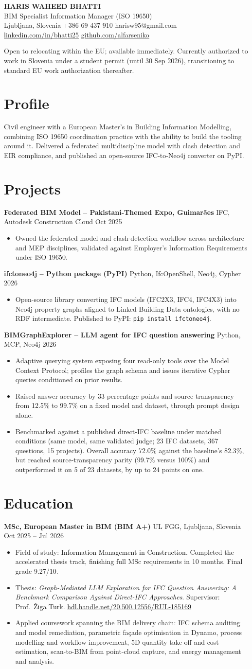 \documentclass[a4paper,10.5pt]{article}
\newcommand{\datefill}{\dotfill}
\newcommand{\entry}[3]{\vspace{2.5pt}\noindent\textbf{#1} \textbar{} #2 \datefill{} #3\par\vspace{0.5pt}}
\newcommand{\ROLELINE}{BIM Specialist \textbar{} Information Manager (ISO 19650)}
\newcommand{\projIfcToNeo}{%
\entry{ifctoneo4j -- Python package (PyPI)}{Python, IfcOpenShell, Neo4j, Cypher}{2026}
\begin{itemize}
  \item Open-source library converting IFC models (IFC2X3, IFC4, IFC4X3) into Neo4j
        property graphs aligned to Linked Building Data ontologies, with no RDF
        intermediate. Published to PyPI: \texttt{pip install ifctoneo4j}.
\end{itemize}}
\newcommand{\projBIMGraph}{%
\entry{BIMGraphExplorer -- LLM agent for IFC question answering}{Python, MCP, Neo4j}{2026}
\begin{itemize}
  \item Adaptive querying system exposing four read-only tools over the Model
        Context Protocol; profiles the graph schema and issues iterative Cypher
        queries conditioned on prior results.
  \item Raised answer accuracy by 33 percentage points and source transparency from
        12.5\% to 99.7\% on a fixed model and dataset, through prompt design alone.
  \item Benchmarked against a published direct-IFC baseline under matched
        conditions (same model, same validated judge; 23 IFC datasets, 367
        questions, 15 projects). Overall accuracy 72.0\% against the baseline's
        82.3\%, but reached source-transparency parity (99.7\% versus 100\%) and
        outperformed it on 5 of 23 datasets, by up to 24 points on one.
\end{itemize}}
\newcommand{\projGuimaraes}{%
\entry{Federated BIM Model -- Pakistani-Themed Expo, Guimar\~aes}{IFC, Autodesk Construction Cloud}{Oct 2025}
\begin{itemize}
  \item Owned the federated model and clash-detection workflow across architecture
        and MEP disciplines, validated against Employer's Information Requirements
        under ISO 19650.
\end{itemize}}
\begin{document}
\begin{center}
  {\LARGE\bfseries HARIS WAHEED BHATTI}\\[2pt]
  {\large \ROLELINE}\\[3pt]
  Ljubljana, Slovenia \textbar{} +386 69 437 910 \textbar{} harisw95@gmail.com\\
  \href{https://linkedin.com/in/bhatti25}{linkedin.com/in/bhatti25} \textbar{}
  \href{https://github.com/alfarseniko}{github.com/alfarseniko}
\end{center}
\vspace{-4pt}
\noindent\small Open to relocating within the EU; available immediately. Currently
authorized to work in Slovenia under a student permit (until 30 Sep 2026),
transitioning to standard EU work authorization thereafter.\normalsize

\section{Profile}

\noindent Civil engineer with a European Master's in Building Information Modelling,
combining ISO 19650 coordination practice with the ability to build the tooling
around it. Delivered a federated multidiscipline model with clash detection and EIR
compliance, and published an open-source IFC-to-Neo4j converter on PyPI.

\section{Projects}

 \projGuimaraes \projIfcToNeo \projBIMGraph

\section{Education}
\entry{MSc, European Master in BIM (BIM A+)}{UL FGG, Ljubljana, Slovenia}{Oct 2025 -- Jul 2026}
\begin{itemize}
  \item Field of study: Information Management in Construction. Completed the
        accelerated thesis track, finishing full MSc requirements in 10 months.
        Final grade 9.27/10.
  \item Thesis: \textit{Graph-Mediated LLM Exploration for IFC Question Answering:
        A Benchmark Comparison Against Direct-IFC Approaches}. Supervisor:
        Prof.~\v{Z}iga Turk. \href{http://hdl.handle.net/20.500.12556/RUL-185169}{hdl.handle.net/20.500.12556/RUL-185169}
  \item Applied coursework spanning the BIM delivery chain: IFC schema auditing and model remediation, parametric façade optimisation in Dynamo, process modelling and workflow improvement, 5D quantity take-off and cost estimation, scan-to-BIM from point-cloud capture, and energy management and analysis.
\end{itemize}
\end{document}
